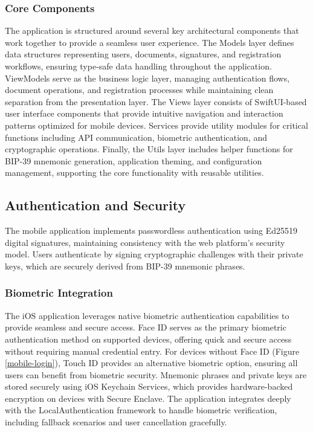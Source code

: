 \subsubsection{Core Components}
The application is structured around several key architectural components that work together to provide a seamless user experience. The Models layer defines data structures representing users, documents, signatures, and registration workflows, ensuring type-safe data handling throughout the application. ViewModels serve as the business logic layer, managing authentication flows, document operations, and registration processes while maintaining clean separation from the presentation layer. The Views layer consists of SwiftUI-based user interface components that provide intuitive navigation and interaction patterns optimized for mobile devices. Services provide utility modules for critical functions including API communication, biometric authentication, and cryptographic operations. Finally, the Utils layer includes helper functions for BIP-39 mnemonic generation, application theming, and configuration management, supporting the core functionality with reusable utilities.

\subsection{Authentication and Security}
The mobile application implements passwordless authentication using Ed25519 digital signatures, maintaining consistency with the web platform's security model. Users authenticate by signing cryptographic challenges with their private keys, which are securely derived from BIP-39 mnemonic phrases.

\subsubsection{Biometric Integration}
The iOS application leverages native biometric authentication capabilities to provide seamless and secure access. Face ID serves as the primary biometric authentication method on supported devices, offering quick and secure access without requiring manual credential entry. For devices without Face ID (Figure \ref{mobile-login}), Touch ID provides an alternative biometric option, ensuring all users can benefit from biometric security. Mnemonic phrases and private keys are stored securely using iOS Keychain Services, which provides hardware-backed encryption on devices with Secure Enclave. The application integrates deeply with the LocalAuthentication framework to handle biometric verification, including fallback scenarios and user cancellation gracefully.


